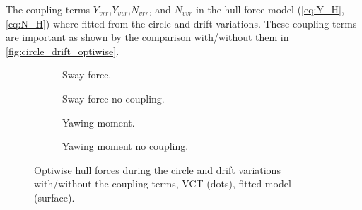 The coupling terms $Y_{vrr}$,$Y_{vvr}$,$N_{vrr}$, and $N_{vvr}$ in the hull force model (\autoref{eq:Y_H}, \autoref{eq:N_H}) where fitted from the circle and drift variations. These coupling terms are important as shown by the comparison with/without them in \autoref{fig:circle_drift_optiwise}.
\begin{figure}[h]
     \centering
     \begin{subfigure}[b]{0.49\textwidth}
         \centering
         
        \caption{Sway force.}
        \label{fig:circle_drift_Y_H_optiwise}
     \end{subfigure}
     \hfill
     \begin{subfigure}[b]{0.49\textwidth}
         \centering
         
        \caption{Sway force no coupling.}
        \label{fig:circle_drift_Y_H_no_coupling_optiwise}
     \end{subfigure}

     \vfill
     \begin{subfigure}[b]{0.49\textwidth}
         \centering
         
        \caption{Yawing moment.}
        \label{fig:circle_drift_N_H_optiwise}
     \end{subfigure}
     \hfill
     \begin{subfigure}[b]{0.49\textwidth}
         \centering
         
        \caption{Yawing moment no coupling.}
        \label{fig:circle_drift_N_H_no_coupling_optiwise}
     \end{subfigure}
     
    \caption{Optiwise hull forces during the circle and drift variations with/without the coupling terms, VCT (dots), fitted model (surface).}
    \label{fig:circle_drift_optiwise}
\end{figure}

